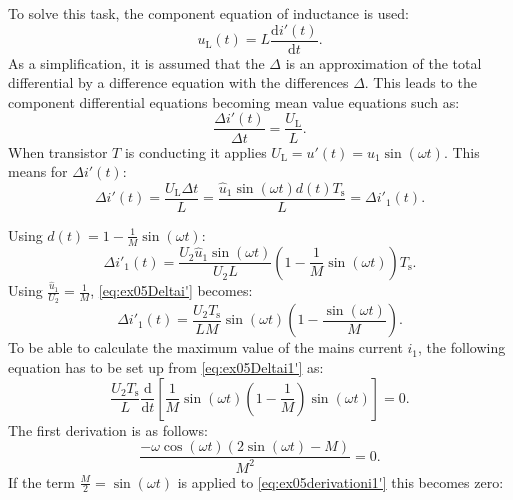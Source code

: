 
\begin{solutionblock}
    To solve this task, the component equation of inductance is used:
    \begin{equation}
        u_{\mathrm{L}}(t) = L \frac{\mathrm{d}i'(t)}{\mathrm{d}t}.
    \end{equation}
    As a simplification, it is assumed that the $\Delta$ is an approximation of the total differential by a difference equation with the differences $\Delta$. This leads to the component differential equations becoming mean value equations such as:
    \begin{equation}
        \frac{\Delta i'(t)}{\Delta t} = \frac{U_{\mathrm{L}}}{L}.
    \end{equation}
    When transistor $T$ is conducting it applies $U_{\mathrm{L}} = u'(t) = \hat u_{\mathrm{1}} \sin(\omega t)$.
    This means for $\Delta i'(t)$:
\begin{equation}
    \Delta i'(t) = \frac{ U_{\mathrm{L}} \Delta t}{L} = \frac{\hat u_{\mathrm{1}} \sin(\omega t) d(t) T_{\mathrm{s}}}{L} = \Delta i'_{\mathrm{1}}(t).
\end{equation}

Using $d(t) = 1 -\frac{1}{M} \sin(\omega t)$:
 \begin{equation}
     \Delta i'_{\mathrm{1}}(t) = \frac{U_{\mathrm{2}}\hat u_{\mathrm{1}}\sin (\omega t)}{U_{\mathrm{2}}L}(1-\frac{1}{M}\sin(\omega t)) T_{\mathrm{s}}\label{eq:ex05Deltai'}.
 \end{equation}
 Using $\frac{\hat u_{\mathrm{1}}}{U_{\mathrm{2}}} = \frac{1}{M}$, \eqref{eq:ex05Deltai'} becomes:
 \begin{equation}
     \Delta i'_{\mathrm{1}}(t) = \frac{U_{\mathrm{2}}T_{\mathrm{s}}}{LM}\sin (\omega t)(1-\frac{\sin(\omega t)}{M}). \label{eq:ex05Deltai1'}
 \end{equation}
   To be able to calculate the maximum value of the mains current
    $i_\mathrm{1}$, the following equation has to be set up from \eqref{eq:ex05Deltai1'} as:
    \begin{equation}
        \frac{U_{\mathrm{2}}T_{\mathrm{s}}}{L} \frac{\mathrm{d}}{\mathrm{d}t}\left[\frac{1}{M}\sin(\omega t)\left(1-\frac{1}{M}\right)\sin(\omega t)\right] =0.
    \end{equation}
    The first derivation is as follows:
    \begin{equation}
        \frac{-\omega \cos(\omega t)(2\sin(\omega t)-M)}{M^2}=0.\label{eq:ex05derivationi1'}
    \end{equation}
    If the term $\frac{M}{2}=\sin(\omega t)$ is applied to \eqref{eq:ex05derivationi1'} this becomes zero:


\end{solutionblock}
